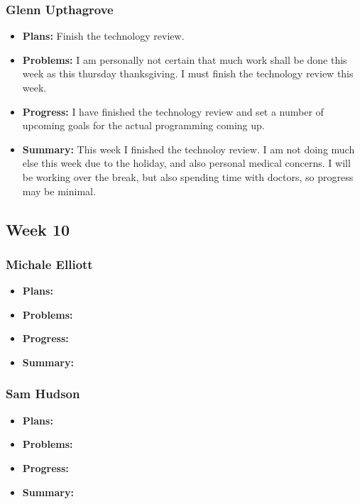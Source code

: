 \documentclass[onecolumn, draftclsnofoot,10pt, compsoc]{IEEEtran}
\begin{document}
\subsubsection{Glenn Upthagrove}
\begin {itemize}
 \item \textbf{Plans: }Finish the technology review. 
 \item \textbf{Problems: }I am personally not certain that much work shall be done this week as this thursday thanksgiving. I must finish the technology review this week.
 \item \textbf{Progress: }I have finished the technology review and set a number of upcoming goals for the actual programming coming up. 
 \item \textbf{Summary: }This week I finished the technoloy review. I am not doing much else this week due to the holiday, and also personal medical concerns. I will be working over the break, but also spending time with doctors, so progress may be minimal. 
\end {itemize}
\subsection {Week 10}
\subsubsection{Michale Elliott}
\begin {itemize}
 \item \textbf{Plans: }
 \item \textbf{Problems: }
 \item \textbf{Progress: }
 \item \textbf{Summary: }
\end {itemize}
\subsubsection{Sam Hudson}
\begin {itemize}
 \item \textbf{Plans: }
 \item \textbf{Problems: }
 \item \textbf{Progress: }
 \item \textbf{Summary: }
\end {itemize}
\end{document}
